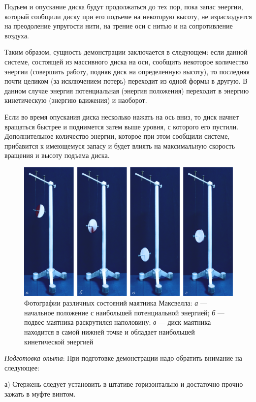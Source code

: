 \documentclass[14pt,a4paper,oneside]{extarticle}	%
\begin{document}
Подъем и опускание диска будут продолжаться до тех пор, пока запас энергии, который сообщили диску при его подъеме на некоторую высоту, не израсходуется на преодоление упругости нити, на трение оси с нитью и на сопротивление воздуха.

Таким образом, сущность демонстрации заключается в следующем: если данной системе, состоящей из массивного диска на оси, сообщить некоторое количество энергии (совершить работу, подняв диск на определенную высоту), то последняя почти целиком (за исключением потерь) переходит из одной формы в другую.
В данном случае энергия потенциальная (энергия положения) переходит в энергию кинетическую (энергию вдижения) и наоборот.

Если во время опускания диска несколько нажать на ось вниз, то диск начнет вращаться быстрее и поднимется затем выше уровня, с которого его пустили.
Дополнительное количество энергии, которое при этом сообщили системе, прибавится к имеющемуся запасу и будет влиять на максимальную скорость вращения и высоту подъема диска.
	
\begin{figure}[H] 	
\centering 	
\includegraphics[width=0.9\linewidth]{Maxwell-2.png}
\caption{Фотографии различных состояний маятника Максвелла: \textit{а} — начальное положение с наибольшей потенциальной энергией; \textit{б} — подвес маятника раскрутился наполовину; \textit{в} — диск маятника находится в самой нижней точке и обладает наибольшей кинетической энергией}
\label{Maxwell-2}
\end{figure}
	
\textit{Подготовка опыта}: При подготовке демонстрации надо обратить внимание на следующее:

а) Стержень следует установить в штативе горизонтально и достаточно прочно зажать в муфте винтом.
\end{document}
